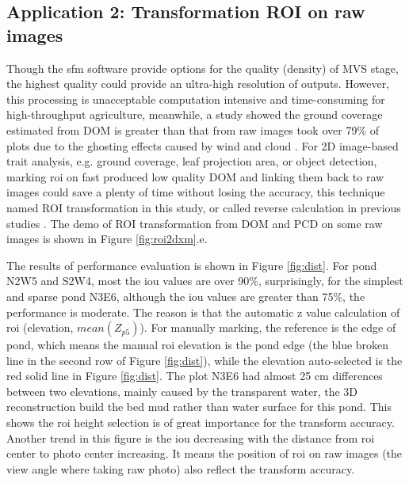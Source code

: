 \documentclass{configs/bmcart}
\begin{document}
\subsection*{Application 2: Transformation ROI on raw images}
Though the \acrshort*{sfm} software provide options for the quality (density) of MVS stage, the highest quality could provide an ultra-high resolution of outputs. However, this processing is unacceptable computation intensive and time-consuming for high-throughput agriculture, meanwhile, a study showed the ground coverage estimated from DOM is greater than that from raw images took over 79\% of plots due to the ghosting effects caused by wind and cloud \cite{duan_comparison_2017}. For 2D image-based trait analysis, e.g. ground coverage, leaf projection area, or object detection, marking \acrshort*{roi} on fast produced low quality DOM and linking them back to raw images could save a plenty of time without losing the accuracy, this technique named ROI transformation in this study, or called reverse calculation in previous studies \cite{tresch_easympe_2019, duan_comparison_2017}. The demo of ROI transformation from DOM and PCD on some raw images is shown in Figure \ref{fig:roi2dxm}.e.

The results of performance evaluation is shown in Figure \ref{fig:dist}. For pond N2W5 and S2W4, most the \acrshort*{iou} values are over 90\%, surprisingly, for the simplest and sparse pond N3E6, although the \acrshort{iou} values are greater than 75\%, the performance is moderate. The reason is that the automatic z value calculation of \acrshort*{roi} (elevation, $mean(Z_{p5})$). For manually marking, the reference is the edge of pond, which means the manual \acrshort*{roi} elevation is the pond edge (the blue broken line in the second row of Figure \ref{fig:dist}), while the elevation auto-selected is the red solid line in Figure \ref{fig:dist}. The plot N3E6 had almost 25 cm differences between two elevations, mainly caused by the transparent water, the 3D reconstruction build the bed mud rather than water surface for this pond. This shows the \acrshort*{roi} height selection is of great importance for the transform accuracy. Another trend in this figure is the \acrshort*{iou} decreasing with the distance from \acrshort*{roi} center to photo center increasing. It means the position of \acrshort*{roi} on raw images (the view angle where taking raw photo) also reflect the transform accuracy. 
\end{document}

